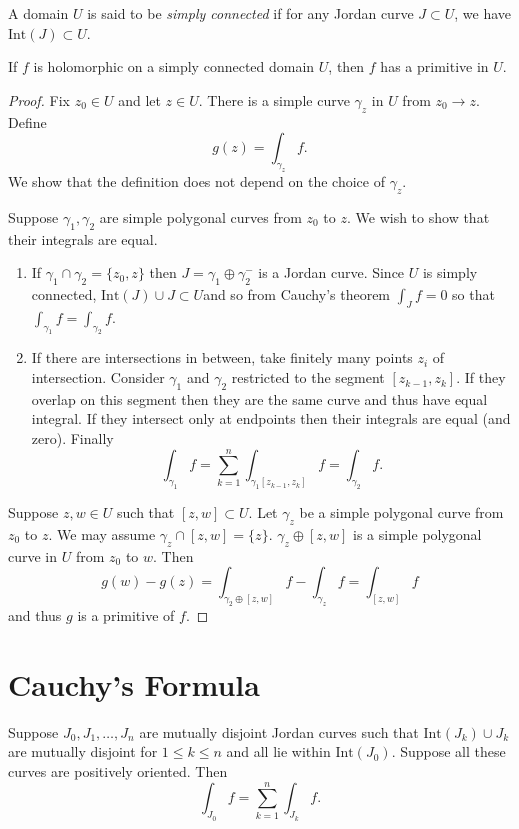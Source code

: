 \begin{defn}
A domain $U$ is said to be \emph{simply connected} if
for any Jordan curve $J \subset U$, we have
$\mathrm{Int}(J) \subset U$.
\end{defn}

\begin{theorem}
If $f$ is holomorphic on a simply connected domain $U$, then $f$
has a primitive in $U$.
\end{theorem}
\begin{proof}
Fix $z_0 \in U$ and let $z \in U$. There is a simple curve
$\gamma_z$ in $U$ from $z_0 \to z$. Define
$$
g(z) = \int_{\gamma_z} f.
$$
We show that the definition does not depend on the choice of $\gamma_z$.

Suppose $\gamma_1, \gamma_2$ are simple polygonal curves from $z_0$ to $z$.
We wish to show that their integrals are equal.
\begin{enumerate}
  \item{
    If $\gamma_1 \cap \gamma_2 = \{z_0, z\}$ then
    $J = \gamma_1 \oplus \gamma_2^{-}$ is a Jordan curve. Since $U$ is
    simply connected, $\mathrm{Int}(J) \cup J \subset U$and so
    from Cauchy's theorem $\int_J f = 0$ so that
    $\int_{\gamma_1} f = \int_{\gamma_2} f$.
  }
  \item{
    If there are intersections in between, take finitely many points
    $z_i$ of intersection. Consider
    $\gamma_1$ and $\gamma_2$ restricted to the segment $[z_{k-1}, z_k]$.
    If they overlap on this segment then they are the same curve and thus
    have equal integral. If they intersect only at endpoints then
    their integrals are equal (and zero).
    Finally
    $$
    \int_{\gamma_1} f = \sum_{k=1}^n \int_{\gamma_1[z_{k-1}, z_k]} f = \int_{\gamma_2} f.
    $$
  }
\end{enumerate}

Suppose $z, w \in U$ such that $[z, w] \subset U$. Let $\gamma_z$ be a
simple polygonal curve from $z_0$ to $z$. We may assume
$\gamma_z \cap [z, w] = \{ z \}$. $\gamma_z \oplus [z, w]$ is a simple
polygonal curve in $U$ from $z_0$ to $w$. Then
$$
g(w) - g(z) = \int_{\gamma_2 \oplus [z, w]} f - \int_{\gamma_z} f = \int_{[z, w]} f
$$
and thus $g$ is a primitive of $f$.
\end{proof}

\section{Cauchy's Formula}
\begin{theorem}
Suppose $J_0, J_1, \dots, J_n$ are mutually disjoint Jordan curves such that
$\mathrm{Int}(J_k) \cup J_k$ are mutually disjoint for $1 \leq k \leq n$
and all lie within $\mathrm{Int}(J_0)$. Suppose all these curves are positively
oriented. Then
$$
\int_{J_0} f = \sum_{k=1}^n \int_{J_k} f.
$$
\end{theorem}
